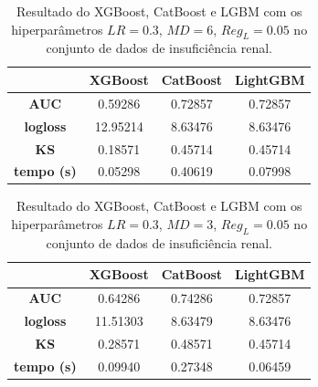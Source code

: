 \begin{table}[H]
\label{res:ren:7}
\centering
\begin{tabular}{|c|c|c|c|}
\hline
	& \textbf{XGBoost} &\textbf{CatBoost} & \textbf{LightGBM} \\
\hline
\textbf{AUC}	& 0.59286&	0.72857	&0.72857 \\
\hline
\textbf{logloss}	& 12.95214	&8.63476&	8.63476 \\
\hline
\textbf{KS}	&0.18571	&0.45714	&0.45714\\
\hline
\textbf{tempo (s)}	&0.05298&	0.40619&	0.07998\\
\hline
\end{tabular}
\caption{Resultado do XGBoost, CatBoost e LGBM com os hiperparâmetros $LR=0.3$, $MD=6$, $Reg_L=0.05$ no conjunto de dados de insuficiência renal.}
\end{table}

\begin{table}[H]
\label{res:ren:8}
\centering
\begin{tabular}{|c|c|c|c|}
\hline
	& \textbf{XGBoost} &\textbf{CatBoost} & \textbf{LightGBM} \\
\hline
\textbf{AUC}	& 0.64286	&0.74286	&0.72857 \\
\hline
\textbf{logloss}	& 11.51303&	8.63479	&8.63476 \\
\hline
\textbf{KS}	&0.28571	&0.48571&	0.45714\\
\hline
\textbf{tempo (s)}	&0.09940&	0.27348	&0.06459 \\
\hline
\end{tabular}
\caption{Resultado do XGBoost, CatBoost e LGBM com os hiperparâmetros $LR=0.3$, $MD=3$, $Reg_L=0.05$ no conjunto de dados de insuficiência renal.}
\end{table}


